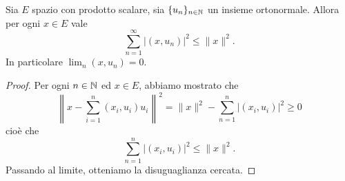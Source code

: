 \begin{theorem}
	Sia $E$ spazio con prodotto scalare, sia $\{u_n\}_{n \in \mathbb{N}}$ un insieme ortonormale.
	Allora per ogni $x \in E$ vale
	\begin{equation*}
		\sum_{n=1}^\infty |(x,u_n)|^2 \leq \|x\|^2.
	\end{equation*}
	In particolare $\lim_n (x,u_n) = 0$.
\end{theorem}
\begin{proof}
	Per ogni $n \in \mathbb{N}$ ed $x \in E$, abbiamo mostrato che
	\begin{equation*}
		\left\|x - \sum_{i=1}^n (x_i,u_i)u_i \right\|^2 = \|x\|^2 - \sum_{n=1}^n |(x_i,u_i)|^2 \geq 0
	\end{equation*}
	cioè che
	\begin{equation*}
		\sum_{n=1}^n |(x_i,u_i)|^2 \leq \|x\|^2.
	\end{equation*}
	Passando al limite, otteniamo la disuguaglianza cercata.
\end{proof}

